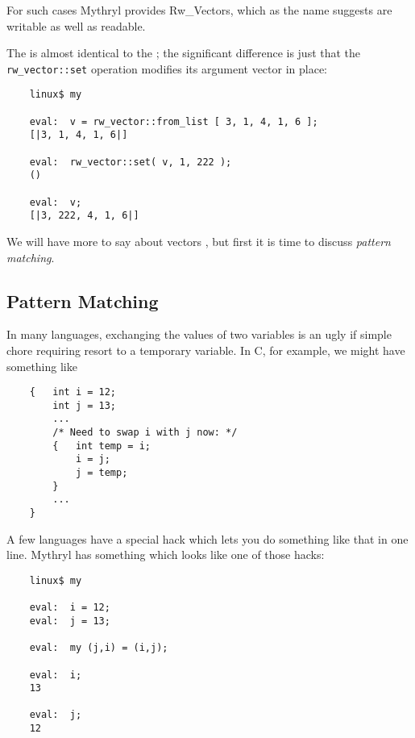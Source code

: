 For such cases Mythryl provides Rw\_Vectors, which as the name suggests are 
writable as well as readable.

The  is almost identical to the 
;  the significant difference is just that the 
{\tt rw\_vector::set} operation modifies its argument vector in place:

\begin{verbatim}
    linux$ my

    eval:  v = rw_vector::from_list [ 3, 1, 4, 1, 6 ];
    [|3, 1, 4, 1, 6|]

    eval:  rw_vector::set( v, 1, 222 );
    ()

    eval:  v;
    [|3, 222, 4, 1, 6|]
\end{verbatim}

We will have more to say about vectors , 
but first it is time to discuss {\it pattern matching}.

\cutend*


\subsection{Pattern Matching}

In many languages, exchanging the values of two variables is an 
ugly if simple chore requiring resort to a temporary variable.  In 
C, for example, we might have something like

\begin{verbatim}
    {   int i = 12;
        int j = 13;
        ...
        /* Need to swap i with j now: */
        {   int temp = i;
            i = j;
            j = temp;
        }
        ...
    }
\end{verbatim}

A few languages have a special hack which lets you do something like that in 
one line.  Mythryl has something which looks like one of those hacks:

\begin{verbatim}
    linux$ my

    eval:  i = 12;
    eval:  j = 13;

    eval:  my (j,i) = (i,j);

    eval:  i;
    13

    eval:  j;
    12
\end{verbatim}

